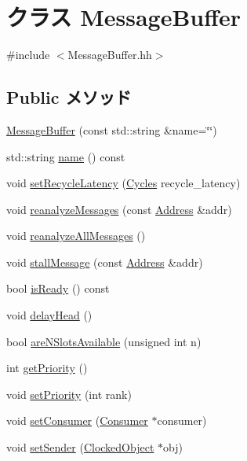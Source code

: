 \hypertarget{classMessageBuffer}{
\section{クラス MessageBuffer}
\label{classMessageBuffer}
}


{\ttfamily \#include $<$MessageBuffer.hh$>$}\subsection*{Public メソッド}
\begin{DoxyCompactItemize}
\item 
\hyperlink{classMessageBuffer_a3ab015b49b89f6f1e8c9facc8441976f}{MessageBuffer} (const std::string \&name=\char`\"{}\char`\"{})
\item 
std::string \hyperlink{classMessageBuffer_a37627d5d5bba7f4a8690c71c2ab3cb07}{name} () const 
\item 
void \hyperlink{classMessageBuffer_ad9be4b0fe9efff18c2e56a1705d99918}{setRecycleLatency} (\hyperlink{classCycles}{Cycles} recycle\_\-latency)
\item 
void \hyperlink{classMessageBuffer_ac8fc02d2f80c73a67e76577139daaaf9}{reanalyzeMessages} (const \hyperlink{classAddress}{Address} \&addr)
\item 
void \hyperlink{classMessageBuffer_adfdac0293f076193ea9e70b12b54ecbe}{reanalyzeAllMessages} ()
\item 
void \hyperlink{classMessageBuffer_abef10942dc67e1641651a1f9542b7303}{stallMessage} (const \hyperlink{classAddress}{Address} \&addr)
\item 
bool \hyperlink{classMessageBuffer_ac12eec09d47a89a1ddf3eb6bb19b5bd3}{isReady} () const 
\item 
void \hyperlink{classMessageBuffer_ae20106ccbc4569ff9474570932956f7f}{delayHead} ()
\item 
bool \hyperlink{classMessageBuffer_a3164aa5c5bbbd31b6b1963ef9c90756f}{areNSlotsAvailable} (unsigned int n)
\item 
int \hyperlink{classMessageBuffer_a8e1ac3494e27c30441640926f0f07b6f}{getPriority} ()
\item 
void \hyperlink{classMessageBuffer_a6f56c404ece2826d0b11ad759fdf0fb4}{setPriority} (int rank)
\item 
void \hyperlink{classMessageBuffer_a81e888318cb316e49e3b6c9989970bb0}{setConsumer} (\hyperlink{classConsumer}{Consumer} $\ast$consumer)
\item 
void \hyperlink{classMessageBuffer_a0a949993188bb0d51b80b714be944447}{setSender} (\hyperlink{classClockedObject}{ClockedObject} $\ast$obj)

\end{DoxyCompactItemize}
